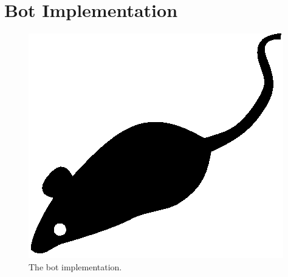 \section{Bot Implementation}
\label{sec:bot-implementation}

\lipsum[1]

\begin{figure}[tp]
	\centering
	\includegraphics{./fig/acmlarge-mouse}
	\caption{The bot implementation.}
		\label{fig:bot-implementation}
\end{figure}

\lipsum[1]
